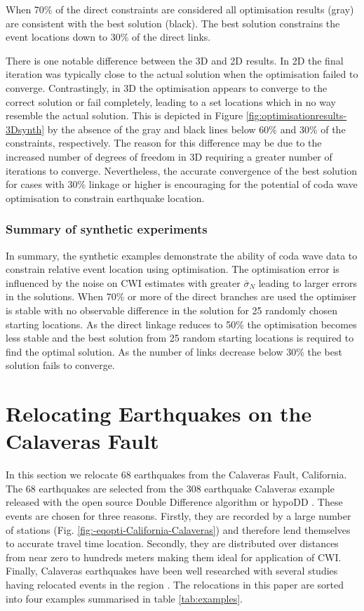 \documentclass[extra]{gji}
\begin{document}
When 70\% of the direct constraints are considered all optimisation
results (gray) are consistent with the best solution (black). The
best solution constrains the event locations down to 30\% of the
direct links.

There is one notable difference between the 3D and 2D results. In 2D
the final iteration was typically close to the actual solution when
the optimisation failed to converge. Contrastingly, in 3D the
optimisation appears to converge to the correct solution or fail
completely, leading to a set locations which in no way resemble the
actual solution. This is depicted in Figure
\ref{fig:optimisationresults-3Dsynth} by the absence of the gray and
black lines below 60\% and 30\% of the constraints, respectively.
The reason for this difference may be due to the increased number of
degrees of freedom in 3D requiring a greater number of iterations to
converge. Nevertheless, the accurate convergence of the best
solution for cases with 30\% linkage or higher is encouraging for
the potential of coda wave optimisation to constrain earthquake
location.

\subsubsection{Summary of synthetic experiments}

In summary, the synthetic examples demonstrate the ability of coda
wave data to constrain relative event location using optimisation.
The optimisation error is influenced by the noise on CWI estimates
with greater $\bar{\sigma}_N$ leading to larger errors in the
solutions. When 70\% or more of the direct branches are used the
optimiser is stable with no observable difference in the solution
for 25 randomly chosen starting locations. As the direct linkage
reduces to 50\% the optimisation becomes less stable and the best
solution from 25 random starting locations is required to find the
optimal solution. As the number of links decrease below
30\% the best solution fails to converge.


\section{Relocating Earthquakes on the Calaveras Fault}
\label{sec:CalaverasLoc-CWIonly}

In this section we relocate 68 earthquakes from the Calaveras Fault,
California. The 68 earthquakes are selected from the 308 earthquake
Calaveras example released with the open source Double Difference
algorithm or hypoDD \citep{dr_Waldhauser00a,dr_Waldhauser01a}. These
events are chosen for three reasons. Firstly, they are recorded by a
large number of stations (Fig.
\ref{fig:-eqopti-California-Calaveras}) and therefore lend
themselves to accurate travel time location. Secondly, they are
distributed over distances from near zero to hundreds
meters making them ideal for application of CWI. Finally, Calaveras
earthquakes have been well researched with several studies having
relocated events in the region \citep{dr_Waldhauser01a,
dr_Schaff02a, dr_Waldhauser08a}. The relocations in this paper are
sorted into four examples summarised in table \ref{tab:examples}.
\end{document}
